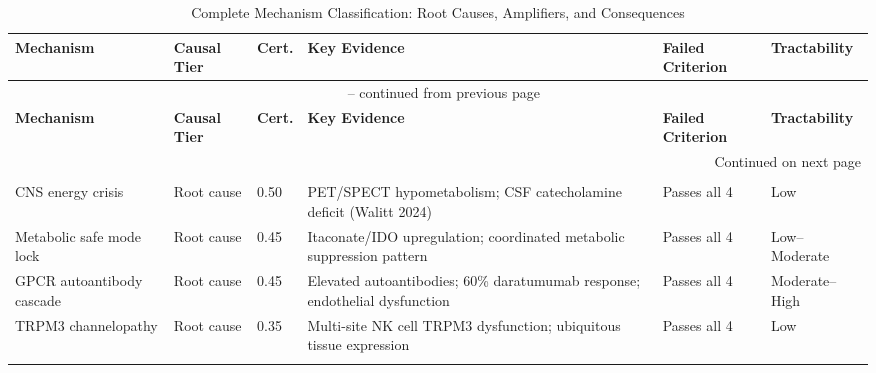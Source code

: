 \begin{landscape}
\begin{longtable}{p{3.2cm}p{2.2cm}p{1.2cm}p{4.5cm}p{3.0cm}p{2.5cm}}
\caption{Complete Mechanism Classification: Root Causes, Amplifiers, and Consequences} \label{tab:mechanism-classification} \\
\toprule
\textbf{Mechanism} & \textbf{Causal Tier} & \textbf{Cert.} & \textbf{Key Evidence} & \textbf{Failed Criterion} & \textbf{Tractability} \\
\midrule
\endfirsthead
\multicolumn{6}{c}{\tablename\ \thetable{} -- continued from previous page} \\
\toprule
\textbf{Mechanism} & \textbf{Causal Tier} & \textbf{Cert.} & \textbf{Key Evidence} & \textbf{Failed Criterion} & \textbf{Tractability} \\
\midrule
\endhead
\midrule \multicolumn{6}{r}{Continued on next page} \\
\endfoot
\bottomrule
\endlastfoot

\multicolumn{6}{l}{\textbf{Trigger-Capable Root Causes}} \\
\midrule
CNS energy crisis & Root cause & 0.50 & PET/SPECT hypometabolism; CSF catecholamine deficit (Walitt 2024) & Passes all 4 & Low \\
\addlinespace
Metabolic safe mode lock & Root cause & 0.45 & Itaconate/IDO upregulation; coordinated metabolic suppression pattern & Passes all 4 & Low--Moderate \\
\addlinespace
GPCR autoantibody cascade & Root cause & 0.45 & Elevated autoantibodies; 60\% daratumumab response; endothelial dysfunction & Passes all 4 & Moderate--High \\
\addlinespace
TRPM3 channelopathy & Root cause & 0.35 & Multi-site NK cell TRPM3 dysfunction; ubiquitous tissue expression & Passes all 4 & Low \\
\addlinespace


\end{longtable}
\end{landscape}
